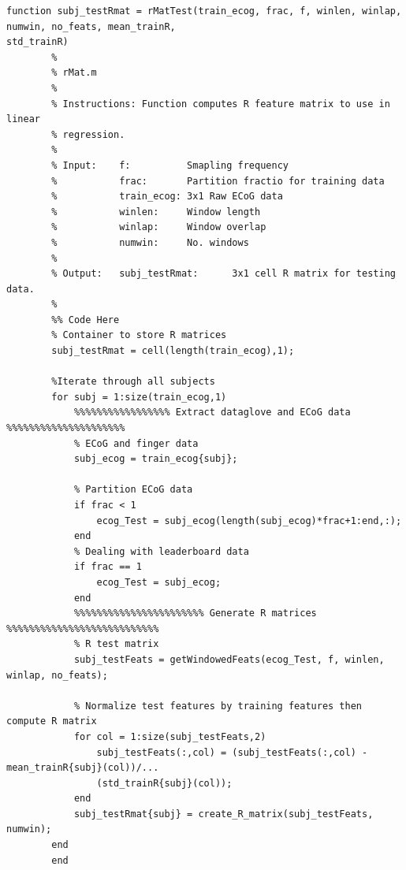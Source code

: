 \documentclass{article}
\begin{document}
	\begin{lstlisting}
function subj_testRmat = rMatTest(train_ecog, frac, f, winlen, winlap, numwin, no_feats, mean_trainR, 
std_trainR)
		%
		% rMat.m
		%
		% Instructions: Function computes R feature matrix to use in linear
		% regression.
		%
		% Input:    f:          Smapling frequency
		%           frac:       Partition fractio for training data
		%           train_ecog: 3x1 Raw ECoG data
		%           winlen:     Window length
		%           winlap:     Window overlap
		%           numwin:     No. windows
		%           
		% Output:   subj_testRmat:      3x1 cell R matrix for testing data.
		% 
		%% Code Here
		% Container to store R matrices
		subj_testRmat = cell(length(train_ecog),1);

		%Iterate through all subjects
		for subj = 1:size(train_ecog,1)
		    %%%%%%%%%%%%%%%%% Extract dataglove and ECoG data %%%%%%%%%%%%%%%%%%%%%
		    % ECoG and finger data
		    subj_ecog = train_ecog{subj};  
		    
		    % Partition ECoG data
		    if frac < 1
		        ecog_Test = subj_ecog(length(subj_ecog)*frac+1:end,:);
		    end
		    % Dealing with leaderboard data
		    if frac == 1
		        ecog_Test = subj_ecog;
		    end
		    %%%%%%%%%%%%%%%%%%%%%%% Generate R matrices %%%%%%%%%%%%%%%%%%%%%%%%%%%
		    % R test matrix 
		    subj_testFeats = getWindowedFeats(ecog_Test, f, winlen, winlap, no_feats);
		    
		    % Normalize test features by training features then compute R matrix
		    for col = 1:size(subj_testFeats,2)
		        subj_testFeats(:,col) = (subj_testFeats(:,col) - mean_trainR{subj}(col))/...
		        (std_trainR{subj}(col));
		    end
		    subj_testRmat{subj} = create_R_matrix(subj_testFeats, numwin);  
		end
		end
	\end{lstlisting}
\end{document}
